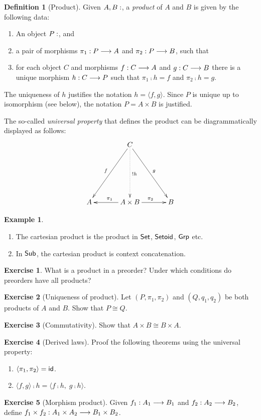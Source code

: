 \documentclass[a4paper,fleqn]{scrartcl}
\theoremstyle{definition}
\newtheorem{definition}{Definition}
\newtheorem{example}{Example}
\newtheorem{exercise}{Exercise}
\let\C\relax %
\newcommand{\C}{\mathcal{C}}
\begin{document}
\begin{definition}[Product]
  Given $A,B : \C$, a \emph{product} of $A$ and $B$ is given by the
  following data:
  \begin{enumerate}
  \item An object $P : \C$, and
  \item a pair of morphisms $\pi_1 : P \longrightarrow A$ and $\pi_2 : P \longrightarrow B$,
    such that
  \item for each object $C$ and morphisms $f : C \longrightarrow A$ and $g : C
    \longrightarrow B$ there is a unique morphism $h : C \longrightarrow P$ such that $\pi_1
    \comp h = f$ and $\pi_2 \comp h = g$.
  \end{enumerate}
  The uniqueness of $h$ justifies the notation $h = \langle f,g \rangle$.
  Since $P$ is unique up to isomorphism (see below),
  the notation $P = A \times B$
  is justified.
\end{definition}
The so-called \emph{universal property} that defines the product can
be diagrammatically displayed as follows:
\[
\xymatrix@C=8ex@R=16ex{
& \ar[dl]_f C \ar@{.>}[d]^{!h} \ar[dr]^g& \\
A & \ar[l]_{\pi_1} A \times B  \ar[r]^{\pi_2} & B \\
}
\]
\begin{example}\bla
  \begin{enumerate}
  \item The cartesian product is the product in $\mathsf{Set}$, $\mathsf{Setoid}$,
    $\mathsf{Grp}$ etc.
  \item In $\mathsf{Sub}$, the cartesian product is context concatenation.
  \end{enumerate}
\end{example}
\begin{exercise}
  What is a product in a preorder?
  Under which conditions do preorders have all products?
\end{exercise}
\begin{exercise}[Uniqueness of product]
  Let $(P,\pi_1,\pi_2)$ and $(Q,q_1,q_2)$ be both products of $A$ and
  $B$.  Show that $P \cong Q$.
\end{exercise}
\begin{exercise}[Commutativity]
  Show that $A \times B \cong B \times A$.
\end{exercise}
\begin{exercise}[Derived laws]
  Proof the following theorems using the universal property:
  \begin{enumerate}
  \item $\langle \pi_1,\pi_2 \rangle = \mathsf{id}$.
  \item $\langle f,g \rangle \comp h = \langle f \comp h,\; g \comp h \rangle$.
  \end{enumerate}
\end{exercise}
\begin{exercise}[Morphism product]
  \label{ex:hom-product}
  Given $f_1 : A_1 \longrightarrow B_1$ and $f_2 : A_2 \longrightarrow B_2$, define $f_1
  \times f_2 : A_1 \times A_2 \longrightarrow B_1 \times B_2$.
\end{exercise}
\end{document}
